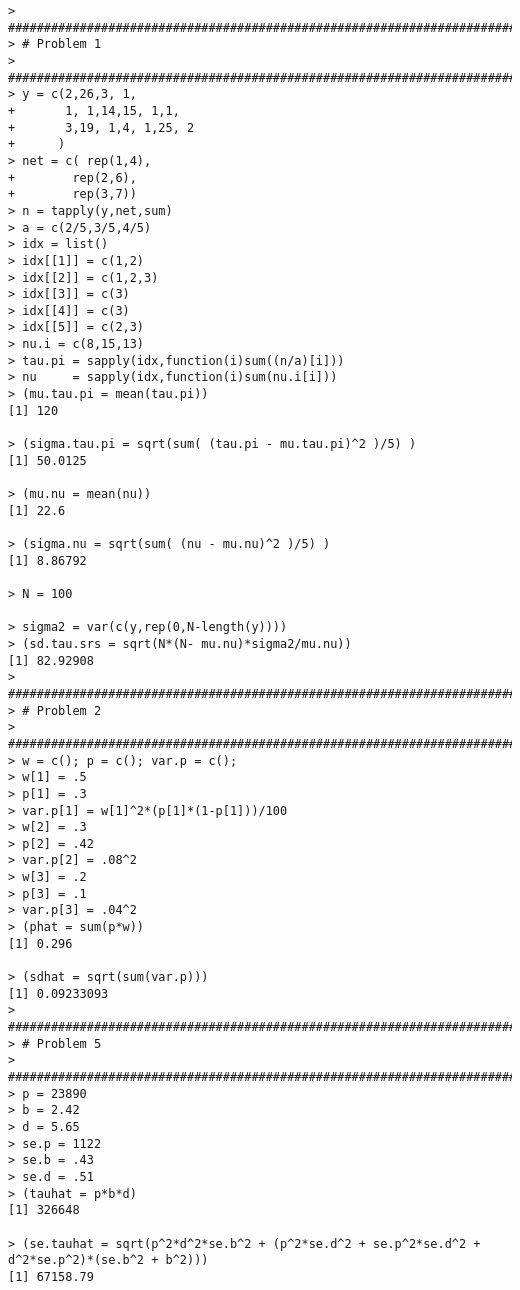 \documentclass[usenames,dvipsnames]{homework}
\begin{document}
\begin{lstlisting}
> ################################################################################
> # Problem 1
> ################################################################################
> y = c(2,26,3, 1,
+       1, 1,14,15, 1,1,
+       3,19, 1,4, 1,25, 2
+      ) 
> net = c( rep(1,4),
+        rep(2,6),
+        rep(3,7)) 
> n = tapply(y,net,sum) 
> a = c(2/5,3/5,4/5) 
> idx = list() 
> idx[[1]] = c(1,2) 
> idx[[2]] = c(1,2,3) 
> idx[[3]] = c(3) 
> idx[[4]] = c(3) 
> idx[[5]] = c(2,3) 
> nu.i = c(8,15,13) 
> tau.pi = sapply(idx,function(i)sum((n/a)[i])) 
> nu     = sapply(idx,function(i)sum(nu.i[i])) 
> (mu.tau.pi = mean(tau.pi))
[1] 120

> (sigma.tau.pi = sqrt(sum( (tau.pi - mu.tau.pi)^2 )/5) )
[1] 50.0125

> (mu.nu = mean(nu))
[1] 22.6

> (sigma.nu = sqrt(sum( (nu - mu.nu)^2 )/5) )
[1] 8.86792

> N = 100

> sigma2 = var(c(y,rep(0,N-length(y)))) 
> (sd.tau.srs = sqrt(N*(N- mu.nu)*sigma2/mu.nu))
[1] 82.92908
> ################################################################################
> # Problem 2
> ################################################################################
> w = c(); p = c(); var.p = c(); 
> w[1] = .5 
> p[1] = .3 
> var.p[1] = w[1]^2*(p[1]*(1-p[1]))/100 
> w[2] = .3 
> p[2] = .42 
> var.p[2] = .08^2 
> w[3] = .2 
> p[3] = .1 
> var.p[3] = .04^2 
> (phat = sum(p*w))
[1] 0.296

> (sdhat = sqrt(sum(var.p)))
[1] 0.09233093
> ################################################################################
> # Problem 5
> ################################################################################
> p = 23890 
> b = 2.42 
> d = 5.65 
> se.p = 1122 
> se.b = .43 
> se.d = .51 
> (tauhat = p*b*d)
[1] 326648

> (se.tauhat = sqrt(p^2*d^2*se.b^2 + (p^2*se.d^2 + se.p^2*se.d^2 + d^2*se.p^2)*(se.b^2 + b^2)))
[1] 67158.79
\end{lstlisting}
\end{document}
